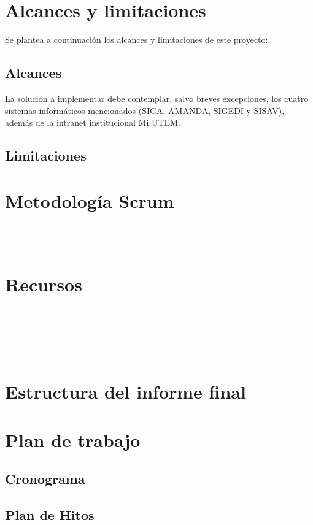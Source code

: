 \section{Alcances y limitaciones}

Se plantea a continuación los alcances y limitaciones de este proyecto:

\subsection{Alcances}

La solución a implementar debe contemplar, salvo breves excepciones, los cuatro sistemas informáticos mencionados (SIGA, AMANDA, SIGEDI y SISAV), además de la intranet institucional Mi UTEM.


\subsection{Limitaciones}
\lipsum[5]

\section{Metodología Scrum}
\lipsum[10] \\
\lipsum[11] \\
\lipsum[12]

\clearpage

\section{Recursos}
\lipsum[20] \\
\lipsum[21] \\
\lipsum[22] \\
\lipsum[23] \\
\lipsum[24]

\clearpage

\section{Estructura del informe final}
\clearpage

\section{Plan de trabajo}
\subsection{Cronograma}

\subsection{Plan de Hitos}

\clearpage


